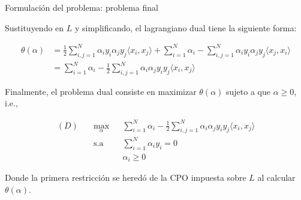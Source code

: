\documentclass[handout, 9pt]{beamer}
\begin{document}
\begin{frame}{Formulación del problema: problema final}

Sustituyendo en $L$ y simplificando, el lagrangiano dual tiene la siguiente forma:

\begin{align*}
	\theta(\alpha) &= \frac{1}{2} \sum_{i,j=1}^N \alpha_i y_i \alpha_j y_j \langle x_i,x_j\rangle + \sum_{i=1}^N \alpha_i - \sum_{i,j=1}^N \alpha_i y_i \alpha_j y_j \langle x_j,x_i\rangle \\
	&= \sum_{i=1}^N \alpha_i - \frac{1}{2} \sum_{i,j=1}^N \alpha_i \alpha_j y_i y_j \langle x_i,x_j\rangle
\end{align*}\pause

Finalmente, el problema dual consiste en maximizar $\theta(\alpha)$ sujeto a que $\alpha\geq 0$, i.e.,


\begin{equation*}
\begin{aligned}
(D)\quad & \underset{\alpha}{\max}
& & \sum\limits_{i=1}^{N}\alpha_i - \frac{1}{2} \sum\limits_{i,j=1}^{N} \alpha_i \alpha_j y_i y_j \langle x_i, x_j\rangle\\
& \text{s.a}
& & \sum\limits_{i=1}^{N} \alpha_i y_i= 0 \\
& &  &\alpha_i \geq 0
\end{aligned}
\end{equation*}

Donde la primera restricción se heredó de la CPO impuesta sobre $L$ al calcular $\theta(\alpha)$.
	
\end{frame}
\end{document}

